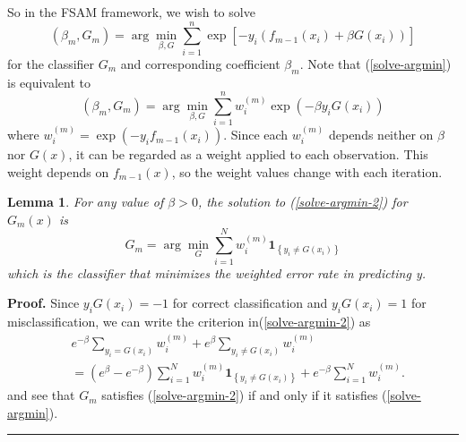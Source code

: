 \documentclass[11pt,twoside]{article}%
\theoremstyle{change}
\newtheorem{lemma}[theorem]{Lemma}
\newenvironment{proof}[1][Proof]{\textbf{#1.} }{\ \rule{0.5em}{0.5em}}
\begin{document}
So in the FSAM framework, we wish to solve
\begin{equation}
\left(  \beta_{m},G_{m}\right)  =\arg\min_{\beta,G}\sum_{i=1}^{n}\exp\left[
-y_{i}\left(  f_{m-1}(x_{i})+\beta G(x_{i})\right)  \right]
\label{solve-argmin}%
\end{equation}
for the classifier $G_{m}$ and corresponding coefficient $\beta_{m}$. Note
that (\ref{solve-argmin}) is equivalent to%
\begin{equation}
\left(  \beta_{m},G_{m}\right)  =\arg\min_{\beta,G}\sum_{i=1}^{n}w_{i}%
^{(m)}\exp\left(  -\beta y_{i}G(x_{i})\right) \label{solve-argmin-2}%
\end{equation}
where $w_{i}^{(m)}=\exp\left(  -y_{i}f_{m-1}(x_{i})\right)  $. Since each
$w_{i}^{(m)}$ depends neither on $\beta$ nor $G(x)$, it can be regarded as a
weight applied to each observation. This weight depends on $f_{m-1}(x)$, so
the weight values change with each iteration.

\begin{lemma}
For any value of $\beta>0$, the solution to (\ref{solve-argmin-2}) for
$G_{m}(x)$ is%
\[
G_{m}=\arg\min_{G}\sum_{i=1}^{N}w_{i}^{(m)}\mathbf{1}_{\left\{  y_{i}\neq
G(x_{i})\right\}  }%
\]
\qquad which is the classifier that minimizes the weighted error rate in
predicting y.
\end{lemma}

\begin{proof}
Since $y_{i}G(x_{i})=-1$ for correct classification and $y_{i}G(x_{i})=1$ for
misclassification, we can write the criterion in(\ref{solve-argmin-2}) as
\begin{align}
& e^{-\beta}\sum_{y_{i}=G(x_{i})}w_{i}^{(m)}+e^{\beta}\sum_{y_{i}\neq
G(x_{i})}w_{i}^{(m)}\label{solve-argmin-3}\\
& =\left(  e^{\beta}-e^{-\beta}\right)  \sum_{i=1}^{N}w_{i}^{(m)}%
\mathbf{1}_{\left\{  y_{i}\neq G(x_{i})\right\}  }+e^{-\beta}\sum_{i=1}%
^{N}w_{i}^{(m)}.\nonumber
\end{align}
and see that $G_{m}$ satisfies (\ref{solve-argmin-2}) if and only if it
satisfies (\ref{solve-argmin}).
\end{proof}
\end{document}

